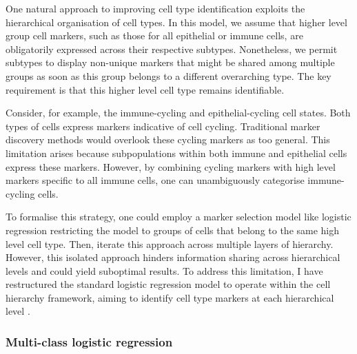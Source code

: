 One natural approach to improving cell type identification exploits the hierarchical organisation of cell types. In this model, we assume that higher level group cell markers, such as those for all epithelial or immune cells, are obligatorily expressed across their respective subtypes. Nonetheless, we permit subtypes to display non-unique markers that might be shared among multiple groups as soon as this group belongs to a different overarching type. The key requirement is that this higher level cell type remains identifiable.

Consider, for example, the immune-cycling and epithelial-cycling cell states. Both types of cells express markers indicative of cell cycling. Traditional marker discovery methods would overlook these cycling markers as too general. This limitation arises because subpopulations within both immune and epithelial cells express these markers. However, by combining cycling markers with high level markers specific to all immune cells, one can unambiguously categorise immune-cycling cells.

To formalise this strategy, one could employ a marker selection model like logistic regression restricting the model to groups of cells that belong to the same high level cell type. Then, iterate this approach across multiple layers of hierarchy. However, this isolated approach hinders information sharing across hierarchical levels and could yield suboptimal results. To address this limitation, I have restructured the standard logistic regression model to operate within the cell hierarchy framework, aiming to identify cell type markers at each hierarchical level .


\subsubsection*{Multi-class logistic regression}

